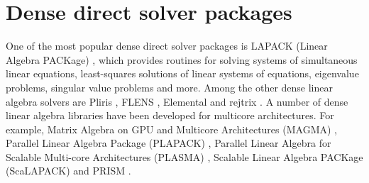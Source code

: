 \section{Dense direct solver packages}
One of the most popular dense direct solver packages is LAPACK (Linear Algebra PACKage) \cite{bai}, which provides routines for solving systems of simultaneous linear equations, least-squares solutions of linear systems of equations, eigenvalue  problems, singular value problems and more. Among the other dense linear algebra solvers are Pliris \cite{pliris}, FLENS \cite{flens}, Elemental \cite{elemental} and rejtrix \cite{rejtrix}. A number of dense linear algebra libraries have been developed for multicore architectures. For example, Matrix Algebra on GPU and Multicore Architectures (MAGMA) \cite{magma}, Parallel Linear Algebra Package (PLAPACK) \cite{plapack}, Parallel Linear Algebra for Scalable Multi-core Architectures (PLASMA) \cite{plasma}, Scalable Linear Algebra PACKage (ScaLAPACK) \cite{scalapack} and PRISM \cite{prism}.

